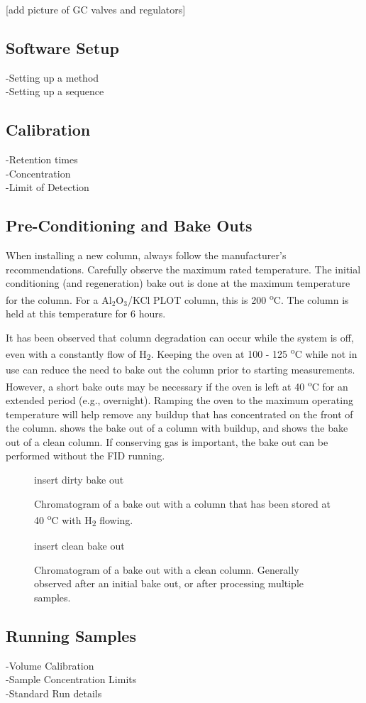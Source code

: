 [add picture of GC valves and regulators]

\subsection{Software Setup}
-Setting up a method\\
-Setting up a sequence

\subsection{Calibration}
-Retention times\\
-Concentration\\
-Limit of Detection

\subsection{Pre-Conditioning and Bake Outs}
When installing a new column, always follow the manufacturer's recommendations. Carefully observe the maximum rated temperature. The initial conditioning (and regeneration) bake out is done at the maximum temperature for the column. For a Al$_2$O$_3$/KCl PLOT column, this is 200 \textsuperscript{o}C. The column is held at this temperature for 6 hours.

It has been observed that column degradation can occur while the system is off, even with a constantly flow of H\textsubscript{2}. Keeping the oven at 100 - 125 \textsuperscript{o}C while not in use can reduce the need to bake out the column prior to starting measurements. However, a short bake outs may be necessary if the oven is left at 40 \textsuperscript{o}C for an extended period (e.g., overnight). Ramping the oven to the maximum operating temperature will help remove any buildup that has concentrated on the front of the column.  shows the bake out of a column with buildup, and  shows the bake out of a clean column. If conserving gas is important, the bake out can be performed without the FID running.

\begin{figure}
    insert dirty bake out
    \centering
    \caption{Chromatogram of a bake out with a column that has been stored at 40 \textsuperscript{o}C with H\textsubscript{2} flowing.}
    \label{fig:dirty bakeout}
\end{figure}

\begin{figure}
    insert clean bake out
    \centering
    \caption{Chromatogram of a bake out with a clean column. Generally observed after an initial bake out, or after processing multiple samples.}
    \label{fig:clean bakeout}
\end{figure}

\subsection{Running Samples}
-Volume Calibration\\
-Sample Concentration Limits\\
-Standard Run details

\pagebreak